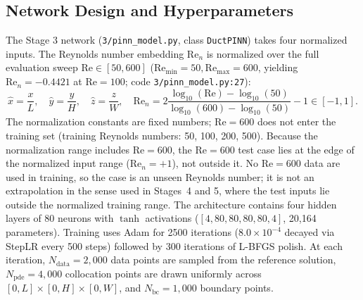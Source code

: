 \documentclass[11pt,a4paper]{article}
\begin{document}
\subsection{Network Design and Hyperparameters}
\label{sec:stage3_arch}
The Stage 3 network (\texttt{3/pinn\_model.py}, class \texttt{DuctPINN}) takes four normalized inputs. The Reynolds number embedding $\mathrm{Re}_n$ is normalized over the full evaluation sweep $\mathrm{Re} \in [50, 600]$ ($\mathrm{Re}_{\min}=50, \mathrm{Re}_{\max}=600$, yielding $\mathrm{Re}_n = -0.4421$ at $\mathrm{Re}=100$; code \texttt{3/pinn\_model.py:27}):
\begin{equation}
\label{eq:stage3_renorm}
\hat{x} = \frac{x}{L}, \quad \hat{y} = \frac{y}{H}, \quad \hat{z} = \frac{z}{W}, \quad \mathrm{Re}_n = 2\frac{\log_{10}(\mathrm{Re}) - \log_{10}(50)}{\log_{10}(600) - \log_{10}(50)} - 1 \in [-1, 1].
\end{equation}
The normalization constants are fixed numbers; $\mathrm{Re} = 600$ does not enter the training set (training Reynolds numbers: 50, 100, 200, 500). Because the normalization range includes $\mathrm{Re} = 600$, the $\mathrm{Re} = 600$ test case lies at the edge of the normalized input range ($\mathrm{Re}_n = +1$), not outside it. No $\mathrm{Re} = 600$ data are used in training, so the case is an unseen Reynolds number; it is not an extrapolation in the sense used in Stages~4 and 5, where the test inputs lie outside the normalized training range.
The architecture contains four hidden layers of 80 neurons with $\tanh$ activations ($[4, 80, 80, 80, 80, 4]$, 20,164 parameters). Training uses Adam for 2500 iterations ($8.0\times 10^{-4}$ decayed via StepLR every 500 steps) followed by 300 iterations of L-BFGS polish.
At each iteration, $N_{\mathrm{data}} = 2{,}000$ data points are sampled from the reference solution, $N_{\mathrm{pde}} = 4{,}000$ collocation points are drawn uniformly across $[0, L] \times [0, H] \times [0, W]$, and $N_{\mathrm{bc}} = 1{,}000$ boundary points.
\end{document}
